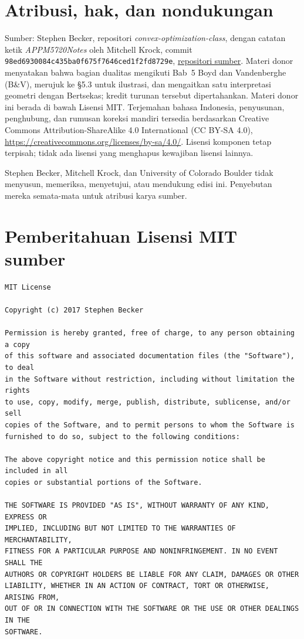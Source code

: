 \documentclass[indonesian]{shinybook}
\begin{document}
\chapter*{Atribusi, hak, dan nondukungan}
Sumber: Stephen Becker, repositori \emph{convex-optimization-class}, dengan
catatan ketik \emph{APPM5720Notes} oleh Mitchell Krock, commit
\texttt{98ed6930084c435ba0f675f7646ced1f2fd8729e},
\href{https://github.com/stephenbeckr/convex-optimization-class}{repositori sumber}.
Materi donor
menyatakan bahwa bagian dualitas mengikuti Bab~5 Boyd dan Vandenberghe
(B\&V), merujuk ke \S5.3 untuk ilustrasi, dan mengaitkan satu interpretasi
geometri dengan Bertsekas; kredit turunan tersebut dipertahankan. Materi donor
ini berada di bawah Lisensi MIT. Terjemahan bahasa Indonesia, penyusunan,
penghubung, dan rumusan koreksi mandiri tersedia berdasarkan Creative Commons
Attribution-ShareAlike 4.0 International (CC BY-SA 4.0),
\url{https://creativecommons.org/licenses/by-sa/4.0/}. Lisensi komponen tetap
terpisah; tidak ada lisensi yang menghapus kewajiban lisensi lainnya.

Stephen Becker, Mitchell Krock, dan University of Colorado Boulder tidak
menyusun, memeriksa, menyetujui, atau mendukung edisi ini. Penyebutan mereka
semata-mata untuk atribusi karya sumber.

\chapter*{Pemberitahuan Lisensi MIT sumber}
\begin{verbatim}
MIT License

Copyright (c) 2017 Stephen Becker

Permission is hereby granted, free of charge, to any person obtaining a copy
of this software and associated documentation files (the "Software"), to deal
in the Software without restriction, including without limitation the rights
to use, copy, modify, merge, publish, distribute, sublicense, and/or sell
copies of the Software, and to permit persons to whom the Software is
furnished to do so, subject to the following conditions:

The above copyright notice and this permission notice shall be included in all
copies or substantial portions of the Software.

THE SOFTWARE IS PROVIDED "AS IS", WITHOUT WARRANTY OF ANY KIND, EXPRESS OR
IMPLIED, INCLUDING BUT NOT LIMITED TO THE WARRANTIES OF MERCHANTABILITY,
FITNESS FOR A PARTICULAR PURPOSE AND NONINFRINGEMENT. IN NO EVENT SHALL THE
AUTHORS OR COPYRIGHT HOLDERS BE LIABLE FOR ANY CLAIM, DAMAGES OR OTHER
LIABILITY, WHETHER IN AN ACTION OF CONTRACT, TORT OR OTHERWISE, ARISING FROM,
OUT OF OR IN CONNECTION WITH THE SOFTWARE OR THE USE OR OTHER DEALINGS IN THE
SOFTWARE.
\end{verbatim}
\end{document}
